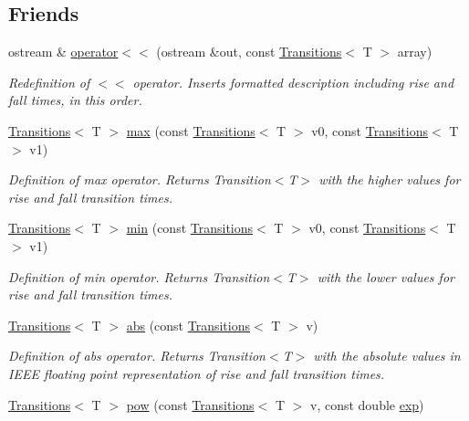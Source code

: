 \subsection*{Friends}
\begin{DoxyCompactItemize}
\item 
ostream \& \hyperlink{classTransitions_a1f38245bca1673c266b44e9e2107c13d}{operator$<$$<$} (ostream \&out, const \hyperlink{classTransitions}{Transitions}$<$ T $>$ array)
\begin{DoxyCompactList}\small\item\em Redefinition of $<$$<$ operator. Inserts formatted description including rise and fall times, in this order. \end{DoxyCompactList}\item 
\hyperlink{classTransitions}{Transitions}$<$ T $>$ \hyperlink{classTransitions_af72b4da733791d7d350ed72162d8ea0f}{max} (const \hyperlink{classTransitions}{Transitions}$<$ T $>$ v0, const \hyperlink{classTransitions}{Transitions}$<$ T $>$ v1)
\begin{DoxyCompactList}\small\item\em Definition of max operator. Returns Transition$<$\-T$>$ with the higher values for rise and fall transition times. \end{DoxyCompactList}\item 
\hyperlink{classTransitions}{Transitions}$<$ T $>$ \hyperlink{classTransitions_aff6065ed38f85bcd39d2c2f8ce45f1d9}{min} (const \hyperlink{classTransitions}{Transitions}$<$ T $>$ v0, const \hyperlink{classTransitions}{Transitions}$<$ T $>$ v1)
\begin{DoxyCompactList}\small\item\em Definition of min operator. Returns Transition$<$\-T$>$ with the lower values for rise and fall transition times. \end{DoxyCompactList}\item 
\hyperlink{classTransitions}{Transitions}$<$ T $>$ \hyperlink{classTransitions_a3b968e944feed8bcb98aa1e6286fe175}{abs} (const \hyperlink{classTransitions}{Transitions}$<$ T $>$ v)
\begin{DoxyCompactList}\small\item\em Definition of abs operator. Returns Transition$<$\-T$>$ with the absolute values in I\-E\-E\-E floating point representation of rise and fall transition times. \end{DoxyCompactList}\item 
\hyperlink{classTransitions}{Transitions}$<$ T $>$ \hyperlink{classTransitions_a34f2a85ed601558365305cdcab645914}{pow} (const \hyperlink{classTransitions}{Transitions}$<$ T $>$ v, const double \hyperlink{classTransitions_ac02e6f8b007f44d55ed6b202c18ac0f8}{exp})

\end{DoxyCompactItemize}
